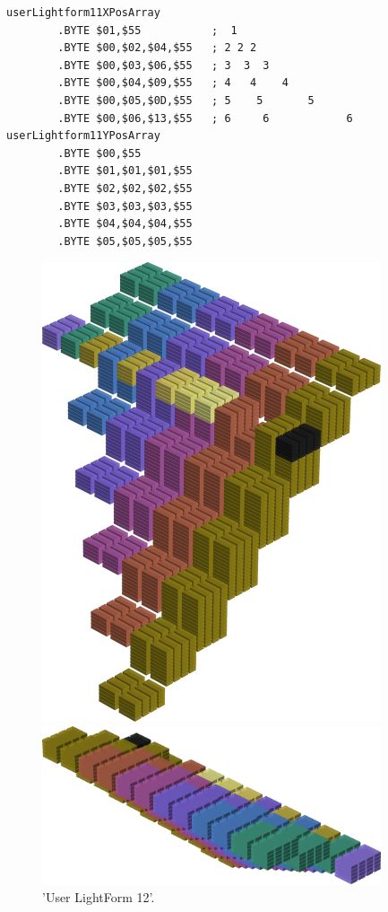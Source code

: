 \begin{lstlisting}
userLightform11XPosArray
        .BYTE $01,$55           ;  1                  
        .BYTE $00,$02,$04,$55   ; 2 2 2               
        .BYTE $00,$03,$06,$55   ; 3  3  3             
        .BYTE $00,$04,$09,$55   ; 4   4    4          
        .BYTE $00,$05,$0D,$55   ; 5    5       5      
        .BYTE $00,$06,$13,$55   ; 6     6            6
userLightform11YPosArray
        .BYTE $00,$55
        .BYTE $01,$01,$01,$55
        .BYTE $02,$02,$02,$55
        .BYTE $03,$03,$03,$55
        .BYTE $04,$04,$04,$55
        .BYTE $05,$05,$05,$55
\end{lstlisting}


\begin{figure}[H]
    \centering
    \begin{adjustbox}{width=10cm,center}
      \includegraphics[width=10cm]{src/colorspace_patterns/pattern20-45.png}%
    \end{adjustbox}
    \begin{adjustbox}{width=10cm}
      \includegraphics[width=10cm]{src/colorspace_patterns/pattern20-225.png}%
    \end{adjustbox}
\caption{'User LightForm 12'.}
\end{figure}
\clearpage

